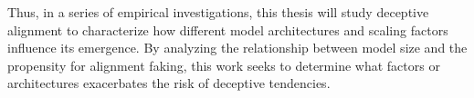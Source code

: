 	Thus, in a series of empirical investigations, this thesis will study deceptive alignment to characterize how different model architectures and scaling factors influence its emergence. By analyzing the relationship between model size and the propensity for alignment faking, this work seeks to determine what factors or architectures exacerbates the risk of deceptive tendencies.